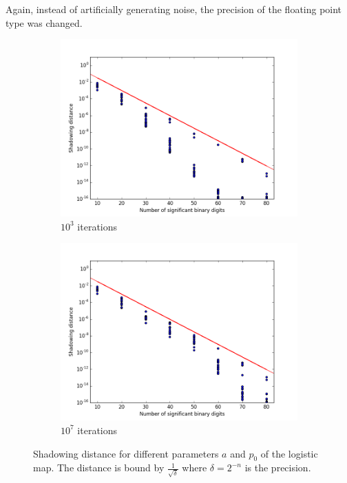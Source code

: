   Again, instead of artificially generating noise, the precision of the
  floating point type was changed.

  \begin{figure}[H]
    \centering
    \begin{subfigure}{.45\textwidth}
      \centering
      \includegraphics[width=1.0\textwidth]{img/dynamic_systems/dist_prec_N_1000}
      \caption{$10^3$ iterations}
    \end{subfigure}
     \begin{subfigure}{.45\textwidth}
      \centering
      \includegraphics[width=1.0\textwidth]{img/dynamic_systems/dist_prec_N_10000000}
      \caption{$10^7$ iterations}
    \end{subfigure}   
    \caption{Shadowing distance for different parameters $a$ and $p_0$ of the  logistic map. The distance is bound by $\frac1{\sqrt \delta}$ where $\delta = 2^{-n}$ is the precision.}
    \label{fig:shadowingdistance1}
  \end{figure}

